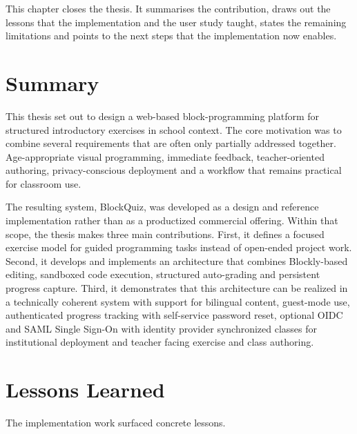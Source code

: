 This chapter closes the thesis. It summarises the contribution, draws out the lessons that the implementation
and the user study taught, states the remaining limitations and points to the next steps that the implementation 
now enables. 

\section{Summary}
\label{sec:summary}
This thesis set out to design a web-based block-programming platform for structured introductory exercises in 
school context. The core motivation was to combine several requirements that are often only partially addressed together. 
Age-appropriate visual programming, immediate feedback, teacher-oriented authoring, privacy-conscious deployment and
a workflow that remains practical for classroom use.

The resulting system, BlockQuiz, was developed as a design and reference implementation rather than as a productized 
commercial offering. Within that scope, the thesis makes three main contributions. 
First, it defines a focused exercise model for guided programming tasks instead of open-ended project work.
Second, it develops and implements an architecture that combines Blockly-based editing, sandboxed code execution, 
structured auto-grading and persistent progress capture. Third, it demonstrates that this architecture can be realized 
in a technically coherent system with support for bilingual content, guest-mode use, authenticated progress tracking
with self-service password reset, optional OIDC and SAML Single Sign-On with identity provider synchronized classes for 
institutional deployment and teacher facing exercise and class authoring.

\section{Lessons Learned}
The implementation work surfaced concrete lessons.

